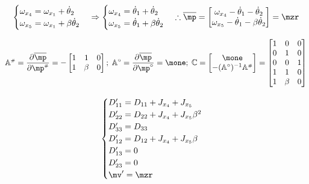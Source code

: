 \documentclass[a4paper,11pt,brazil,fleqn]{article}
\begin{document}
\begin{equation}
\begin{cases}
\omega_{x_4} = \omega_{x_1} + \dot{\theta}_2 \\
\omega_{x_5} = \omega_{x_1} + \beta\dot{\theta}_2 \\
\end{cases}
\Rightarrow
\begin{cases}
\omega_{x_4} = \dot{\theta}_1 + \dot{\theta}_2 \\
\omega_{x_5} = \dot{\theta}_1 + \beta\dot{\theta}_2 \\
\end{cases}
\therefore
\overline{\mp} = 
\begin{bmatrix}
\omega_{x_4} - \dot{\theta}_1 - \dot{\theta}_2 \\
\omega_{x_5} - \dot{\theta}_1 - \beta\dot{\theta}_2 \\
\end{bmatrix}
=\mzr
\end{equation}

\begin{equation}
\mA\ssh = \frac{\partial \overline{\mp}}{\partial \mp\ssh} = -
\begin{bmatrix}
1 & 1     & 0 \\
1 & \beta & 0 \\
\end{bmatrix}; \;
\mA^\circ = \frac{\partial \overline{\mp}}{\partial \mp^\circ} = \mone; \;
\mC =
\begin{bmatrix}
\mone \\
-(\mA^\circ)^{-1} \mA\ssh
\end{bmatrix}  =
\begin{bmatrix}
1 & 0 & 0 \\
0 & 1 & 0 \\
0 & 0 & 1 \\
1 & 1     & 0 \\
1 & \beta & 0 \\
\end{bmatrix} 
\end{equation}

\begin{equation}
\begin{cases}
D'_{11} = D_{11} + J_{x_4} + J_{x_5} \\
D'_{22} = D_{22} + J_{x_4} + J_{x_5} \beta^2 \\
D'_{33} = D_{33} \\
D'_{12} = D_{12} + J_{x_4} + J_{x_5} \beta \\
D'_{13} = 0 \\
D'_{23} = 0\\
\mv' = \mzr \\
\end{cases}
\end{equation}
\end{document}
